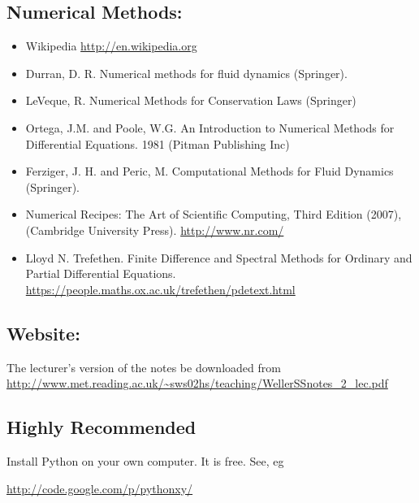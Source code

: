 \subsection*{Numerical Methods: }
\begin{itemize}
\item Wikipedia \url{http://en.wikipedia.org} 
\item Durran, D. R. Numerical methods for fluid dynamics (Springer). 
\item LeVeque, R. Numerical Methods for Conservation Laws (Springer)
\item Ortega, J.M. and Poole, W.G. An Introduction to Numerical Methods
for Differential Equations. 1981 (Pitman Publishing Inc)
\item Ferziger, J. H. and Peric, M. Computational Methods for Fluid Dynamics
(Springer). 
\item Numerical Recipes: The Art of Scientific Computing, Third Edition
(2007), (Cambridge University Press). \url{http://www.nr.com/} 
\item Lloyd N. Trefethen. Finite Difference and Spectral Methods for Ordinary
and Partial Differential Equations. \url{https://people.maths.ox.ac.uk/trefethen/pdetext.html}
\end{itemize}

\subsection*{Website:}

The lecturer's version of the notes be downloaded from\\
 \url{http://www.met.reading.ac.uk/~sws02hs/teaching/WellerSSnotes_2_lec.pdf}


\subsection*{Highly Recommended}

{\color{red} Install Python on your own computer. It is free. See,
eg

\url{http://code.google.com/p/pythonxy/} }
